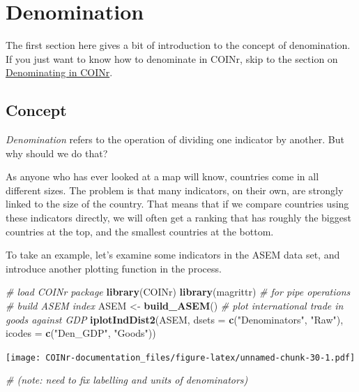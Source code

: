 \documentclass[
]{book}
\newenvironment{Shaded}{\begin{snugshade}}{\end{snugshade}}
\newcommand{\CommentTok}[1]{\textcolor[rgb]{0.56,0.35,0.01}{\textit{#1}}}
\newcommand{\DataTypeTok}[1]{\textcolor[rgb]{0.13,0.29,0.53}{#1}}
\newcommand{\KeywordTok}[1]{\textcolor[rgb]{0.13,0.29,0.53}{\textbf{#1}}}
\newcommand{\NormalTok}[1]{#1}
\newcommand{\StringTok}[1]{\textcolor[rgb]{0.31,0.60,0.02}{#1}}
\begin{document}
\hypertarget{denomination}{%
\chapter{Denomination}\label{denomination}}

The first section here gives a bit of introduction to the concept of denomination. If you just want to know how to denominate in COINr, skip to the section on \protect\hyperlink{denominating-in-coinr}{Denominating in COINr}.

\hypertarget{concept-1}{%
\section{Concept}\label{concept-1}}

\emph{Denomination} refers to the operation of dividing one indicator by another. But why should we do that?

As anyone who has ever looked at a map will know, countries come in all different sizes. The problem is that many indicators, on their own, are strongly linked to the size of the country. That means that if we compare countries using these indicators directly, we will often get a ranking that has roughly the biggest countries at the top, and the smallest countries at the bottom.

To take an example, let's examine some indicators in the ASEM data set, and introduce another plotting function in the process.

\begin{Shaded}
\begin{Highlighting}[]
\CommentTok{# load COINr package}
\KeywordTok{library}\NormalTok{(COINr)}
\KeywordTok{library}\NormalTok{(magrittr) }\CommentTok{# for pipe operations}
\CommentTok{# build ASEM index}
\NormalTok{ASEM <-}\StringTok{ }\KeywordTok{build_ASEM}\NormalTok{()}
\CommentTok{# plot international trade in goods against GDP}
\KeywordTok{iplotIndDist2}\NormalTok{(ASEM, }\DataTypeTok{dsets =} \KeywordTok{c}\NormalTok{(}\StringTok{"Denominators"}\NormalTok{, }\StringTok{"Raw"}\NormalTok{), }\DataTypeTok{icodes =} \KeywordTok{c}\NormalTok{(}\StringTok{"Den_GDP"}\NormalTok{, }\StringTok{"Goods"}\NormalTok{))}
\end{Highlighting}
\end{Shaded}

\texttt{[image: COINr-documentation\_files/figure-latex/unnamed-chunk-30-1.pdf]}

\begin{Shaded}
\begin{Highlighting}[]
\CommentTok{# (note: need to fix labelling and units of denominators)}
\end{Highlighting}
\end{Shaded}
\end{document}
